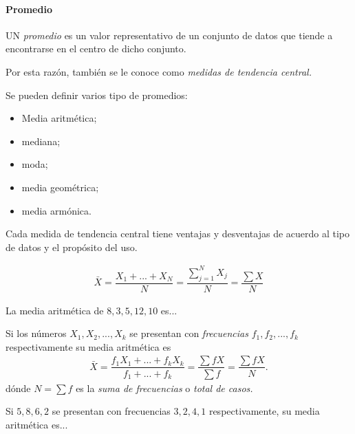 \paragraph{Promedio}
UN \emph{promedio} es un valor representativo de un conjunto de datos que tiende a encontrarse en el centro de dicho conjunto. 

Por esta razón, también se le conoce como \emph{medidas de tendencia central.}



Se pueden definir varios tipo de promedios: 
\begin{itemize}
 \item Media aritmética;
 \item mediana;
 \item moda;
 \item media geométrica;
 \item media armónica.
\end{itemize}



 \begin{rem}
  Cada medida de tendencia central tiene ventajas y desventajas de acuerdo al tipo de datos y el propósito del uso.
 \end{rem}



\begin{defn}
 \begin{align}
 \label{3.1}
\bar{X} =\dfrac{X_{1}+...+X_{N}}{N} = \dfrac{\sum_{j=1}^{N}X_{j}}{N}=\dfrac{\sum X}{N}
\end{align}
\end{defn}



\begin{ejemplo}
 La media aritmética de $8,3,5,12,10$ es...
\end{ejemplo}



Si los números $X_{1},X_{2},...,X_{k}$ se presentan con \emph{frecuencias} $f_{1}, f_{2},...,f_{k}$ respectivamente su media aritmética es
\begin{align}
 \label{3.2}
 \bar{X}=\dfrac{f_{1}X_{1}+...+f_{k}X_{k}}{f_{1}+...+f_{k}}=\dfrac{\sum fX}{\sum f}=\dfrac{\sum fX}{N}.
\end{align}
dónde $N=\sum f$ es la \emph{suma de frecuencias} o \emph{total de casos.}


\begin{ejemplo}
 Si $5,8,6,2$ se presentan con frecuencias $3,2,4,1$ respectivamente, su media aritmética es...
\end{ejemplo}


